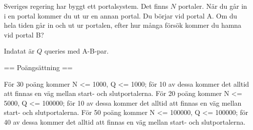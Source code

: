 
Sveriges regering har byggt ett portalsystem. Det finns $N$ portaler. När du går in i en portal kommer du ut ur en annan portal. Du börjar vid portal A. Om du hela tiden går in och ut ur portalen, efter hur många försök kommer du hamna vid portal B?

Indatat är $Q$ queries med A-B-par.

== Poängsättning ==

För 30 poäng kommer N <= 1000, Q <= 1000; för 10 av dessa kommer det alltid att finnas en väg mellan start- och slutportalerna.
För 20 poäng kommer N <= 5000, Q <= 100000; för 10 av dessa kommer det alltid att finnas en väg mellan start- och slutportalerna.
För 50 poäng kommer N <= 100000, Q <= 100000; för 40 av dessa kommer det alltid att finnas en väg mellan start- och slutportalerna.
